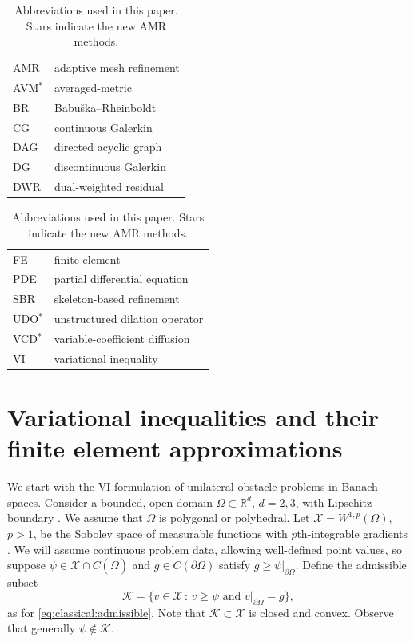 \documentclass[]{interact}
\theoremstyle{plain}%
\theoremstyle{definition}
\theoremstyle{remark}
\newcommand{\RR}{\mathbb{R}}
\newcommand{\cK}{\mathcal{K}}
\newcommand{\cX}{\mathcal{X}}
\begin{document}
\begin{table}[ht]
\centering
\begin{minipage}[t]{0.45\textwidth}
\vspace{0pt}
{\small
\begin{tabular}{ll} \\
AMR       & adaptive mesh refinement \\
AVM$^*$   & averaged-metric \\
BR        & Babu\v{s}ka--Rheinboldt \\
CG        & continuous Galerkin \\
DAG       & directed acyclic graph \\
DG        & discontinuous Galerkin \\
DWR       & dual-weighted residual
\end{tabular}
}
\end{minipage}
\quad
\begin{minipage}[t]{0.45\textwidth}
\vspace{0pt}
{\small
\begin{tabular}{ll} \\
FE        & finite element \\
PDE       & partial differential equation \\
SBR       & skeleton-based refinement \\
UDO$^*$   & unstructured dilation operator \\
VCD$^*$   & variable-coefficient diffusion \\
VI        & variational inequality
\end{tabular}
}
\end{minipage}


\caption{Abbreviations used in this paper.  Stars indicate the new AMR methods.}
\label{tab:abbrev}
\end{table}


\section{Variational inequalities and their finite element approximations} \label{sec:vifem}

We start with the VI formulation of unilateral obstacle problems in Banach spaces.  Consider a bounded, open domain $\Omega \subset \RR^d$, $d=2,3$, with Lipschitz boundary \cite{Ciarlet2002}.  We assume that $\Omega$ is polygonal or polyhedral.  Let $\cX = W^{1,p}(\Omega)$, $p>1$, be the Sobolev space of measurable functions with $p$th-integrable gradients \cite{Evans2010}.  We will assume continuous problem data, allowing well-defined point values, so suppose $\psi \in \cX \cap C(\bar\Omega)$ and $g\in C(\partial \Omega)$ satisfy $g \ge \psi|_{\partial\Omega}$.  Define the admissible subset
\begin{equation} \label{eq:admissible}
\cK = \{v \in \cX \,:\, v \ge \psi \text{ and } v|_{\partial \Omega} = g\},
\end{equation}
as for \eqref{eq:classical:admissible}.  Note that $\cK\subset \cX$ is closed and convex.  Observe that generally $\psi\notin\cK$.
\end{document}
